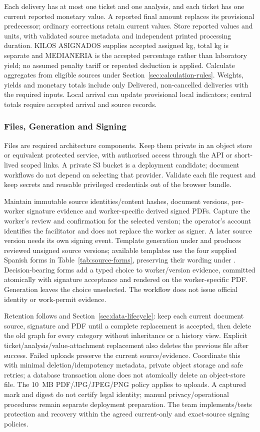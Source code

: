 Each delivery has at most one ticket and one analysis, and each ticket has one
current reported monetary value. A reported final amount replaces its provisional
predecessor; ordinary corrections retain current values. Store reported values
and units, with validated source metadata and independent printed processing
duration. KILOS ASIGNADOS supplies accepted assigned kg, total kg is separate and MEDIANERIA is the accepted percentage rather than laboratory yield; no assumed penalty tariff or repeated deduction is applied.
Calculate aggregates from eligible sources under Section~\ref{sec:calculation-rules}.
Weights, yields and monetary totals include only Delivered, non-cancelled
deliveries with the required inputs. Local arrival can update provisional local
indicators; central totals require accepted arrival and source records.

\subsubsection{Files, Generation and Signing}
Files are required architecture components. Keep them private in an object store
or equivalent protected service, with authorised access through the API or
short-lived scoped links. A private S3 bucket is a deployment candidate; document workflows do not depend
on selecting that provider. Validate each file request and keep
secrets and reusable privileged credentials out of the browser bundle.

Maintain immutable source identities/content hashes, document versions, per-worker
signature evidence and worker-specific derived signed PDFs. Capture the worker's
review and confirmation for the selected version; the operator's account identifies
the facilitator and does not replace the worker as signer. A later source version
needs its own signing event. Template generation under  and
 produces reviewed unsigned source versions; available templates
use the four supplied Spanish forms in Table~\ref{tab:source-forms}, preserving their wording under . Decision-bearing forms add a typed choice
to worker/version evidence, committed atomically with signature acceptance and
rendered on the worker-specific PDF. Generation leaves the choice unselected. The workflow does not issue official identity
or work-permit evidence.


Retention follows  and Section~\ref{sec:data-lifecycle}: keep
each current document source, signature and PDF until a complete replacement is accepted,
then delete the old graph for every category without inheritance or a history view.
Explicit ticket/analysis/value-attachment replacement also deletes the previous file
after success. Failed uploads preserve the current source/evidence. Coordinate this
with minimal deletion/idempotency metadata, private object storage and safe retries;
a database transaction alone does not atomically delete an object-store file.
The 10~MB PDF/JPG/JPEG/PNG policy applies to uploads. A captured mark and digest
do not certify legal identity; manual privacy/operational procedures remain separate
deployment preparation. The team implements/tests protection and recovery within
the agreed current-only and exact-source signing policies.

